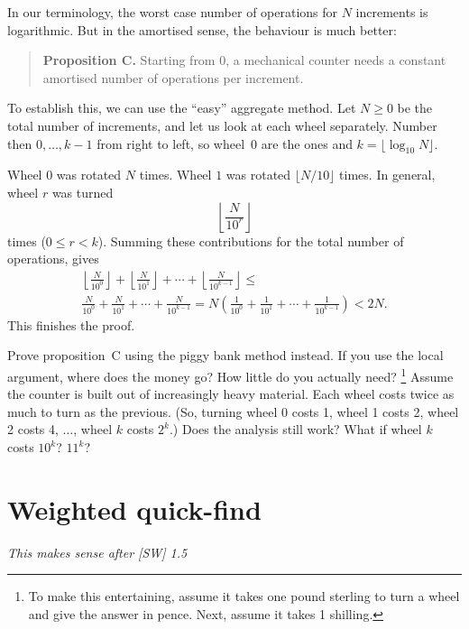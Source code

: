 \documentclass{tufte-handout}
\begin{document}
In our terminology, the worst case number of operations for $N$
increments is logarithmic. But in the amortised sense, the behaviour
is much better:

\begin{quote}
  {\bf Proposition C.}  Starting from 0, a mechanical counter needs a
  constant amortised number of operations per increment.
\end{quote}

To establish this, we can use the ``easy'' aggregate method. Let
$N\geq 0$
be the total number of increments, and let us look at each wheel
separately. Number then $0,\ldots, k-1$ from right to left, so wheel~$0$
are the ones and $k=\lfloor \log_{10} N\rfloor$.

Wheel $0$ was rotated $N$ times. Wheel $1$ was rotated $\lfloor
N/10\rfloor$ times. In general, wheel $r$ was turned \[ \left \lfloor
\frac{N}{10^r} \right\rfloor\] times ($0\leq r < k$). Summing these
contributions for the total number of operations, gives 
\begin{multline*}
 \left \lfloor
\frac{N}{10^0} \right\rfloor +
 \left \lfloor
\frac{N}{10^1} \right\rfloor +
\cdots +
 \left \lfloor
\frac{N}{10^{k-1}} \right\rfloor
\leq \\
\frac{N}{10^0} +
\frac{N}{10^1} +
\cdots +
\frac{N}{10^{k-1}} 
=
N\left(\frac{1}{10^0}+\frac{1}{10^1}+\cdots+\frac{1}{10^{k-1}} \right)
< 2N.
\end{multline*}
This finishes the proof.

\begin{ExerciseList}
\Exercise
Prove proposition~C using the piggy bank method instead.
If you use the local argument, where does the money go?
How little do you actually need?
\footnote{To make this entertaining, assume it takes one pound
  sterling to turn a wheel and give the answer in pence.
  Next, assume it takes 1 shilling.}
\Exercise
 Assume the counter is built out of increasingly heavy material. 
 Each wheel costs twice as much to turn as the previous.
 (So, turning wheel 0 costs 1, wheel 1 costs 2, wheel 2 costs 4, 
 $\ldots$,  wheel $k$ costs $2^k$.)
 Does the analysis still work?
 What if wheel $k$ costs $10^k$? $11^k$?
\end{ExerciseList}

\section{Weighted quick-find}

\emph{This makes sense after [SW] 1.5}
\end{document}
